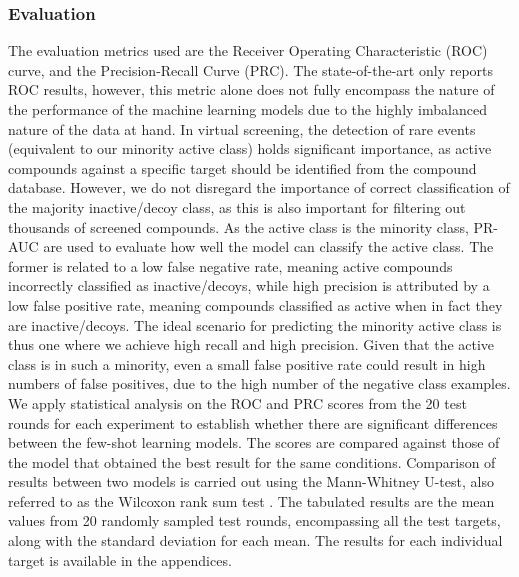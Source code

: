 \subsubsection{Evaluation}

The evaluation metrics used are the Receiver Operating Characteristic (ROC) curve, and the Precision-Recall Curve (PRC). The state-of-the-art \cite{altae2017low} only reports ROC results, however, this metric alone does not fully encompass the nature of the performance of the machine learning models due to the highly imbalanced nature of the data at hand. In virtual screening, the detection of rare events (equivalent to our minority active class) holds significant importance, as active compounds against a specific target should be identified from the compound database. However, we do not disregard the importance of correct classification of the majority inactive/decoy class, as this is also important for filtering out thousands of screened compounds. As the active class is the minority class, PR-AUC are used to evaluate how well the model can classify the active class. The former is related to a low false negative rate, meaning active compounds incorrectly classified as inactive/decoys, while high precision is attributed by a low false positive rate, meaning compounds classified as active when in fact they are inactive/decoys. The ideal scenario for predicting the minority active class is thus one where we achieve high recall and high precision. Given that the active class is in such a minority, even a small false positive rate could result in high numbers of false positives, due to the high number of the negative class examples. We apply statistical analysis on the ROC and PRC scores from the 20 test rounds for each experiment to establish whether there are significant differences between the few-shot learning models. The scores are compared against those of the model that obtained the best result for the same conditions. Comparison of results between two models is carried out using the Mann-Whitney U-test, also referred to as the Wilcoxon rank sum test \citep{mann1947test}. The tabulated results are the mean values from 20 randomly sampled test rounds, encompassing all the test targets, along with the standard deviation for each mean. The results for each individual target is available in the appendices.
